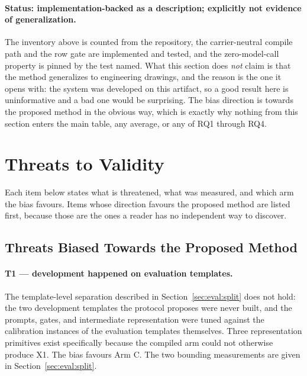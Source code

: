 \paragraph{Status: implementation-backed as a description; explicitly not evidence of
generalization.}
The inventory above is counted from the repository, the carrier-neutral compile path and the
row gate are implemented and tested, and the zero-model-call property is pinned by the test
named. What this section does \emph{not} claim is that the method generalizes to engineering
drawings, and the reason is the one it opens with: the system was developed on this artifact,
so a good result here is uninformative and a bad one would be surprising. The bias direction is
towards the proposed method in the obvious way, which is exactly why nothing from this section
enters the main table, any average, or any of RQ1 through RQ4.

\section{Threats to Validity}
\label{sec:eval:threats}

Each item below states what is threatened, what was measured, and which arm the bias favours.
Items whose direction favours the proposed method are listed first, because those are the ones
a reader has no independent way to discover.

\subsection{Threats Biased Towards the Proposed Method}
\label{sec:eval:threats:favourable}

\paragraph{T1 --- development happened on evaluation templates.}
The template-level separation described in Section~\ref{sec:eval:split} does not hold: the two
development templates the protocol proposes were never built, and the prompts, gates, and
intermediate representation were tuned against the calibration instances of the evaluation
templates themselves. Three representation primitives exist specifically because the compiled
arm could not otherwise produce X1. The bias favours Arm C. The two bounding
measurements are given in Section~\ref{sec:eval:split}.

